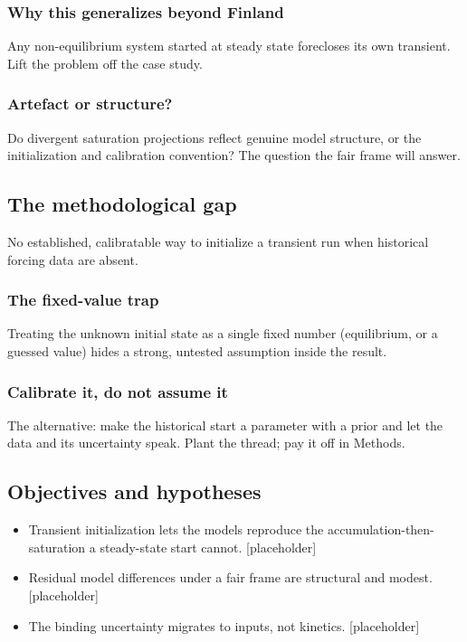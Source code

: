 \documentclass[11pt]{article}
\begin{document}
\subsubsection{Why this generalizes beyond Finland}
Any non-equilibrium system started at steady state forecloses its own
transient. Lift the problem off the case study.

\subsubsection{Artefact or structure?}
Do divergent saturation projections reflect genuine model structure, or the
initialization and calibration convention? The question the fair frame will
answer.

\subsection{The methodological gap}
No established, calibratable way to initialize a transient run when
historical forcing data are absent.

\subsubsection{The fixed-value trap}
Treating the unknown initial state as a single fixed number (equilibrium, or a
guessed value) hides a strong, untested assumption inside the result.

\subsubsection{Calibrate it, do not assume it}
The alternative: make the historical start a parameter with a prior and let
the data and its uncertainty speak. Plant the thread; pay it off in Methods.

\subsection{Objectives and hypotheses}
\begin{itemize}
  \item[H1] Transient initialization lets the models reproduce the
        accumulation-then-saturation a steady-state start cannot. [placeholder]
  \item[H2] Residual model differences under a fair frame are structural and
        modest. [placeholder]
  \item[H3] The binding uncertainty migrates to inputs, not kinetics.
        [placeholder]
\end{itemize}
\end{document}

